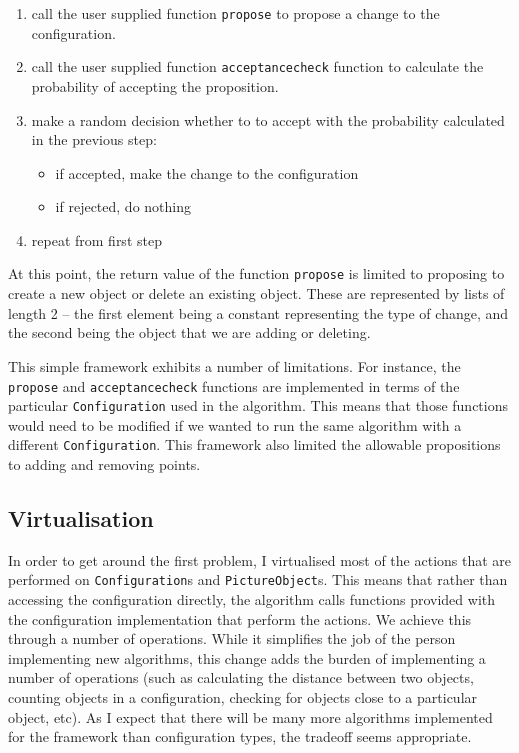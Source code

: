 \begin{enumerate}
\item call the user supplied function \texttt{propose} to propose a
change to the configuration.
\item call the user supplied function \texttt{acceptancecheck}
function to calculate the probability of accepting the proposition.
\item make a random decision whether to to accept with the probability
calculated in the previous step:
\begin{itemize}
\item if accepted, make the change to the configuration
\item if rejected, do nothing
\end{itemize}
\item repeat from first step
\end{enumerate}

At this point, the return value of the function \texttt{propose} is
limited to proposing to create a new object or delete an existing
object.  These are represented by lists of length 2 -- the first
element being a constant representing the type of change, and the
second being the object that we are adding or deleting.

This simple framework exhibits a number of limitations.  For instance,
the \texttt{propose} and \texttt{acceptancecheck} functions are
implemented in terms of the particular \texttt{Configuration} used in
the algorithm.  This means that those functions would need to be
modified if we wanted to run the same algorithm with a different
\texttt{Configuration}.  This framework also limited the allowable
propositions to adding and removing points.


\subsection{Virtualisation}

In order to get around the first problem, I virtualised most of the
actions that are performed on \texttt{Configuration}s and
\texttt{Picture\-Object}s.  This means that rather than accessing the
configuration directly, the algorithm calls functions provided with
the configuration implementation that perform the actions.  We achieve
this through a number of \GAP{} operations.  While it simplifies the
job of the person implementing new algorithms, this change adds the
burden of implementing a number of operations (such as calculating the
distance between two objects, counting objects in a configuration,
checking for objects close to a particular object, etc).  As I expect
that there will be many more algorithms implemented for the framework
than configuration types, the tradeoff seems appropriate.

